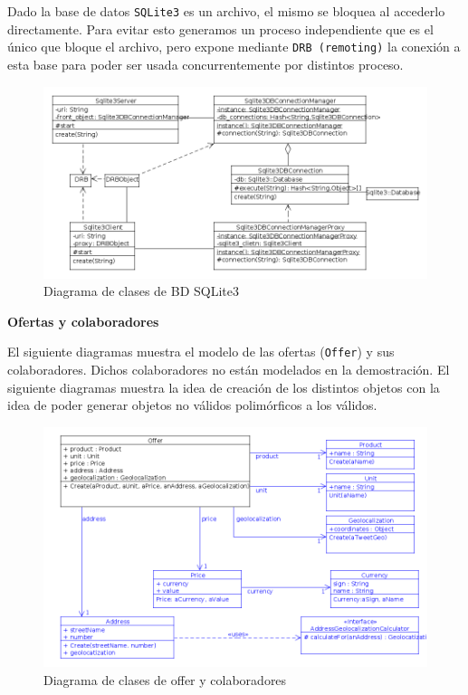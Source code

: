 Dado la base de datos \texttt{SQLite3} es un archivo, el mismo se bloquea al accederlo
directamente. Para evitar esto generamos un proceso independiente que es el \'unico que bloque el archivo, pero expone mediante \texttt{DRB (remoting)} la conexi\'on a esta base para poder ser usada concurrentemente por distintos proceso.

\begin{figure}[h]
\centerline{\includegraphics[width=0.6\paperwidth]{./imgs/class_diagram_sqlite3_client_server.png}}
\caption{Diagrama de clases de BD SQLite3}
\label{fig:class_sqlite3_client_server}
\end{figure}

\textbf{Ofertas y colaboradores}

El siguiente diagramas muestra el modelo de las ofertas (\texttt{Offer}) y sus colaboradores. Dichos colaboradores no est\'an modelados en la demostraci\'on.
El siguiente diagramas muestra la idea de creaci\'on de los distintos objetos
con la idea de poder generar objetos no v\'alidos polim\'orficos a los v\'alidos.

\begin{figure}[h]
\centerline{\includegraphics[width=0.5\paperwidth]{./imgs/class_diagram_offer.png}}
\caption{Diagrama de clases de offer y colaboradores}
\label{fig:class_offer}
\end{figure}


